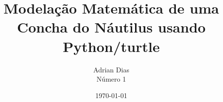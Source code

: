 \title{Modelação Matemática de uma Concha do Náutilus usando Python/turtle}
\author{Adrian Dias \\ Número 1}
\date{\today}

\maketitle
